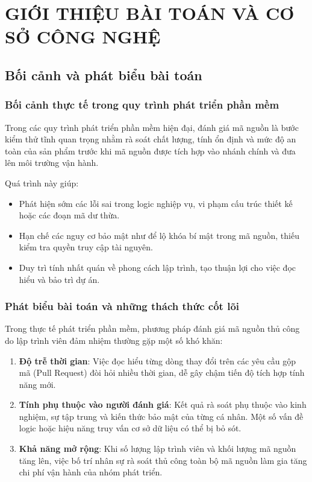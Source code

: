 \documentclass[12pt,a4paper]{report}
\begin{document}
\chapter{GIỚI THIỆU BÀI TOÁN VÀ CƠ SỞ CÔNG NGHỆ}

\section{Bối cảnh và phát biểu bài toán}
\subsection{Bối cảnh thực tế trong quy trình phát triển phần mềm}
Trong các quy trình phát triển phần mềm hiện đại, đánh giá mã nguồn là bước kiểm thử tĩnh quan trọng nhằm rà soát chất lượng, tính ổn định và mức độ an toàn của sản phẩm trước khi mã nguồn được tích hợp vào nhánh chính và đưa lên môi trường vận hành.

Quá trình này giúp:
\begin{itemize}
    \item Phát hiện sớm các lỗi sai trong logic nghiệp vụ, vi phạm cấu trúc thiết kế hoặc các đoạn mã dư thừa.
    \item Hạn chế các nguy cơ bảo mật như để lộ khóa bí mật trong mã nguồn, thiếu kiểm tra quyền truy cập tài nguyên.
    \item Duy trì tính nhất quán về phong cách lập trình, tạo thuận lợi cho việc đọc hiểu và bảo trì dự án.
\end{itemize}

\subsection{Phát biểu bài toán và những thách thức cốt lõi}
Trong thực tế phát triển phần mềm, phương pháp đánh giá mã nguồn thủ công do lập trình viên đảm nhiệm thường gặp một số khó khăn:
\begin{enumerate}
    \item \textbf{Độ trễ thời gian}: Việc đọc hiểu từng dòng thay đổi trên các yêu cầu gộp mã (Pull Request) đòi hỏi nhiều thời gian, dễ gây chậm tiến độ tích hợp tính năng mới.
    \item \textbf{Tính phụ thuộc vào người đánh giá}: Kết quả rà soát phụ thuộc vào kinh nghiệm, sự tập trung và kiến thức bảo mật của từng cá nhân. Một số vấn đề logic hoặc hiệu năng truy vấn cơ sở dữ liệu có thể bị bỏ sót.
    \item \textbf{Khả năng mở rộng}: Khi số lượng lập trình viên và khối lượng mã nguồn tăng lên, việc bố trí nhân sự rà soát thủ công toàn bộ mã nguồn làm gia tăng chi phí vận hành của nhóm phát triển.
\end{enumerate}
\end{document}

